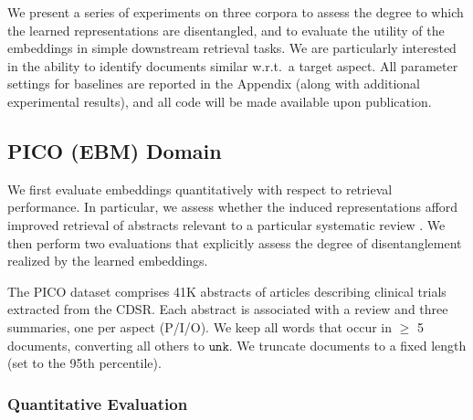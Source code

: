 \documentclass[11pt,a4paper]{article}
\begin{document}
We present a series of experiments on three corpora to assess the degree to which the learned representations are disentangled, and to evaluate the utility of the embeddings in simple downstream retrieval tasks. We are particularly interested in the ability to identify documents similar w.r.t.~a target aspect. All parameter settings for baselines are reported in the Appendix (along with additional experimental results), and all code will be made available upon publication.

\vspace{-.5em}
\subsection{PICO (EBM) Domain}
\label{section:PICO}
\vspace{-.25em}

We first evaluate embeddings quantitatively with respect to retrieval performance. In particular, we assess whether the induced representations afford improved retrieval of abstracts relevant to a particular systematic review \cite{cohen2006reducing,wallace2010semi}. We then perform two evaluations that explicitly assess the degree of disentanglement realized by the learned embeddings.

The PICO dataset comprises 41K abstracts of articles describing clinical trials extracted from the CDSR. Each abstract is associated with a review and three summaries, one per aspect (P/I/O). We keep all words that occur in $\geq$ 5 documents, converting all others to $\texttt{unk}$. We truncate documents to a fixed length (set to the 95th percentile). 




\vspace{-.1em}
\subsubsection{Quantitative Evaluation}
\vspace{-.25em}
\end{document}
